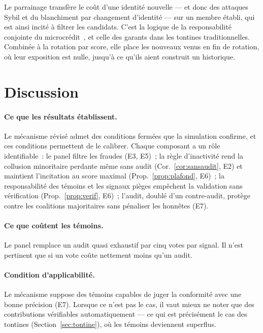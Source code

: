 \documentclass[11pt,a4paper]{article}
\theoremstyle{plain}
\theoremstyle{definition}
\theoremstyle{remark}
\newcommand{\1}{\mathbf{1}}
\begin{document}
Le parrainage transfère le coût d'une identité nouvelle --- et donc des attaques
Sybil et du blanchiment par changement d'identité --- sur un membre établi,
qui est ainsi incité à filtrer les candidats. C'est la logique de la
responsabilité conjointe du microcrédit~\cite{besley1995,ghatak1999}, et
celle des garants dans les tontines traditionnelles. Combinée à la rotation
par score, elle place les nouveaux venus en fin de rotation, où leur exposition
est nulle, jusqu'à ce qu'ils aient construit un historique.

\section{Discussion}

\label{sec:discussion}
\paragraph{Ce que les résultats établissent.} Le mécanisme révisé admet des
conditions fermées que la simulation confirme, et ces conditions permettent de
le calibrer. Chaque composant a un rôle identifiable~: le panel filtre les
fraudes (E3, E5)~; la règle d'inactivité rend la collusion minoritaire
perdante même sans audit (Cor.~\ref{cor:sansaudit}, E2) et maintient
l'incitation au score maximal (Prop.~\ref{prop:plafond}, E6)~; la
responsabilité des témoins et les signaux pièges empêchent la validation sans
vérification (Prop.~\ref{prop:verif}, E6)~; l'audit, doublé d'un contre-audit,
protège contre les coalitions majoritaires sans pénaliser les honnêtes (E7).

\paragraph{Ce que coûtent les témoins.} Le panel remplace un audit
quasi exhaustif par cinq votes par signal. Il n'est pertinent que si un vote
coûte nettement moins qu'un audit.

\paragraph{Condition d'applicabilité.} Le mécanisme suppose des témoins
capables de juger la conformité avec une bonne précision (E7). Lorsque ce n'est
pas le cas, il vaut mieux ne noter que des contributions vérifiables
automatiquement --- ce qui est précisément le cas des tontines
(Section~\ref{sec:tontine}), où les témoins deviennent superflus.
\end{document}
